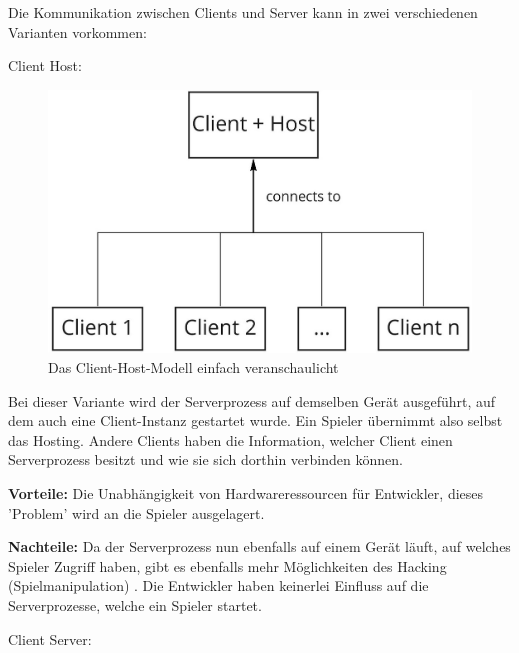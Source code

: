 Die Kommunikation zwischen Clients und Server kann in zwei verschiedenen Varianten vorkommen:

\textsf{\Large Client Host:}

\begin{figure}[H]
	\centering
	\includegraphics[width=150mm]{images/Client_Host.jpg}
	\caption[Client-Server Modell]{Das Client-Host-Modell einfach veranschaulicht}
	\label{pic:Client_Host}
\end{figure}

Bei dieser Variante wird der Serverprozess auf demselben Gerät ausgeführt, auf dem auch eine Client-Instanz gestartet wurde. Ein Spieler übernimmt also selbst das Hosting. Andere Clients haben die Information, welcher Client einen Serverprozess besitzt und wie sie sich dorthin verbinden können. 

\textbf{Vorteile:} Die Unabhängigkeit von Hardwareressourcen für Entwickler, dieses 'Problem' wird an die Spieler ausgelagert. 

\textbf{Nachteile:} Da der Serverprozess nun ebenfalls auf einem Gerät läuft, auf welches Spieler Zugriff haben, gibt es ebenfalls mehr Möglichkeiten des Hacking (Spielmanipulation) \cite{Wikipedia.2021h}. Die Entwickler haben keinerlei Einfluss auf die Serverprozesse, welche ein Spieler startet.
\cite{Smed.2002}

\newpage
\textsf{\Large Client Server:}

